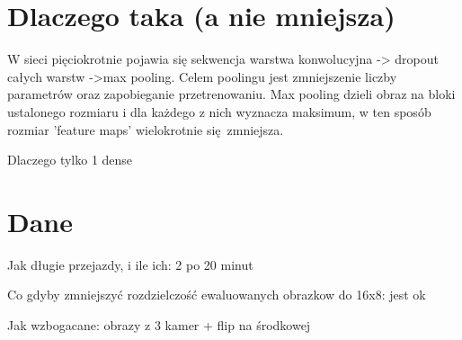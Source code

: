 \section{Dlaczego taka (a nie mniejsza)}
W sieci pięciokrotnie pojawia się sekwencja warstwa konwolucyjna -> dropout 
całych warstw ->max pooling.
Celem poolingu jest zmniejszenie liczby parametrów oraz zapobieganie 
przetrenowaniu. Max pooling dzieli obraz na bloki ustalonego rozmiaru i 
dla każdego z nich wyznacza maksimum, w ten sposób rozmiar 'feature maps' 
wielokrotnie się zmniejsza.

Dlaczego tylko 1 dense

\section{Dane}
Jak długie przejazdy, i ile ich: 2 po 20 minut

Co gdyby zmniejszyć rozdzielczość ewaluowanych obrazkow do 16x8: jest ok

Jak wzbogacane: obrazy z 3 kamer + flip na środkowej

